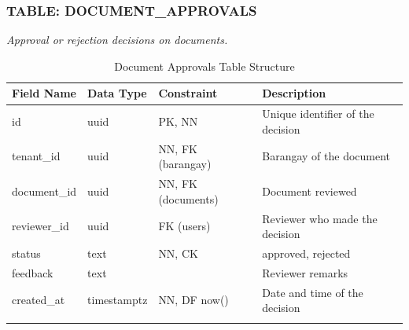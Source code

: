 \subsubsection*{TABLE: DOCUMENT\_APPROVALS}
\noindent\textit{Approval or rejection decisions on documents.}
\begin{longtable}{|p{3.2cm}|p{2.2cm}|p{3.2cm}|p{5.4cm}|}
\hline
\textbf{Field Name} & \textbf{Data Type} & \textbf{Constraint} & \textbf{Description} \\ \hline
\endhead
\hline \endfoot
\hline \endlastfoot
id & uuid & PK, NN & Unique identifier of the decision \\ \hline
tenant\_id & uuid & NN, FK (barangay) & Barangay of the document \\ \hline
document\_id & uuid & NN, FK (documents) & Document reviewed \\ \hline
reviewer\_id & uuid & FK (users) & Reviewer who made the decision \\ \hline
status & text & NN, CK & approved, rejected \\ \hline
feedback & text & & Reviewer remarks \\ \hline
created\_at & timestamptz & NN, DF now() & Date and time of the decision \\ \hline
\caption{Document Approvals Table Structure}
\label{tab:document_approvals}
\end{longtable}
\vspace{3mm}

